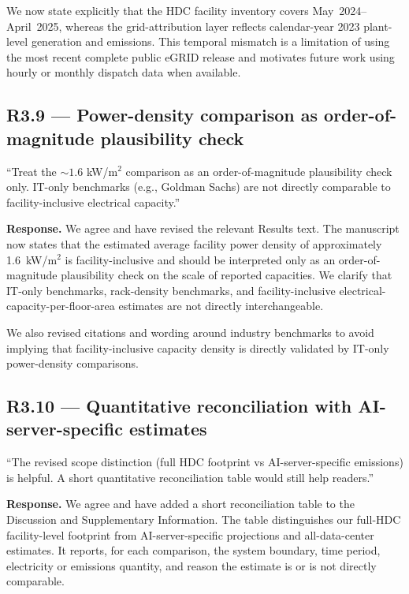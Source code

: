 \documentclass[11pt]{article}
\newenvironment{revquote}{%
  \begin{mdframed}[
    leftmargin=0.5em,
    rightmargin=0.5em,
    linewidth=0pt,
    backgroundcolor=gray!8,
    skipabove=0.5em,
    skipbelow=0.5em,
    innertopmargin=0.6em,
    innerbottommargin=0.6em,
    innerleftmargin=0.8em,
    innerrightmargin=0.8em
  ]%
  \itshape%
}{%
  \end{mdframed}%
}
\begin{document}
We now state explicitly that the HDC facility inventory covers May~2024--April~2025, whereas the grid-attribution layer reflects calendar-year 2023 plant-level generation and emissions. This temporal mismatch is a limitation of using the most recent complete public eGRID release and motivates future work using hourly or monthly dispatch data when available.

\subsection*{R3.9 --- Power-density comparison as order-of-magnitude plausibility check}

\begin{revquote}
``Treat the $\sim 1.6$ kW/m$^2$ comparison as an order-of-magnitude plausibility check only. IT-only benchmarks (e.g., Goldman Sachs) are not directly comparable to facility-inclusive electrical capacity.''
\end{revquote}

\textbf{Response.} We agree and have revised the relevant Results text. The manuscript now states that the estimated average facility power density of approximately 1.6~kW/m$^2$ is facility-inclusive and should be interpreted only as an order-of-magnitude plausibility check on the scale of reported capacities. We clarify that IT-only benchmarks, rack-density benchmarks, and facility-inclusive electrical-capacity-per-floor-area estimates are not directly interchangeable.

We also revised citations and wording around industry benchmarks to avoid implying that facility-inclusive capacity density is directly validated by IT-only power-density comparisons.

\subsection*{R3.10 --- Quantitative reconciliation with AI-server-specific estimates}

\begin{revquote}
``The revised scope distinction (full HDC footprint vs AI-server-specific emissions) is helpful. A short quantitative reconciliation table would still help readers.''
\end{revquote}

\textbf{Response.} We agree and have added a short reconciliation table to the Discussion and Supplementary Information. The table distinguishes our full-HDC facility-level footprint from AI-server-specific projections and all-data-center estimates. It reports, for each comparison, the system boundary, time period, electricity or emissions quantity, and reason the estimate is or is not directly comparable.
\end{document}
